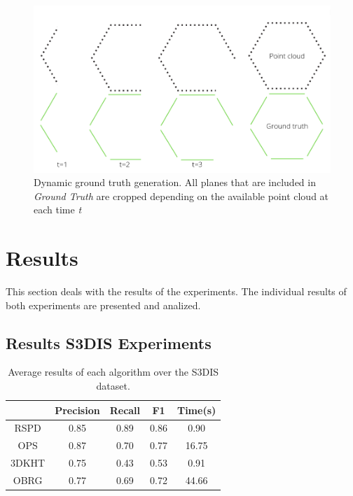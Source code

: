 \documentclass[main.tex]{subfiles}
\begin{document}
\begin{figure}[H]
    \centering
    \includegraphics[width=15 cm]{images/dynamic_eval.png}
    \caption[Dynamic Ground Truth Generation]{Dynamic ground truth generation. All planes that are included in \textit{Ground Truth} are cropped depending on
        the available point cloud at each time \textit{t} }
    \label{fig:dynGT}
\end{figure}

\section{Results}
This section deals with the results of the experiments. The individual results of both experiments are presented and analized.

\subsection{Results S3DIS Experiments}

\begin{table}[H]
    \centering
    \begin{tabular}{c|cccc}
              & Precision & Recall & F1   & Time(s) \\ \hline
        RSPD  & 0.85      & 0.89   & 0.86 & 0.90    \\
        OPS   & 0.87      & 0.70   & 0.77 & 16.75   \\
        3DKHT & 0.75      & 0.43   & 0.53 & 0.91    \\
        OBRG  & 0.77      & 0.69   & 0.72 & 44.66
    \end{tabular}
    \caption[Overall S3DIS Results]{Average results of each algorithm over the S3DIS dataset.}
    \label{tab:algo-acc}
\end{table}
\end{document}
